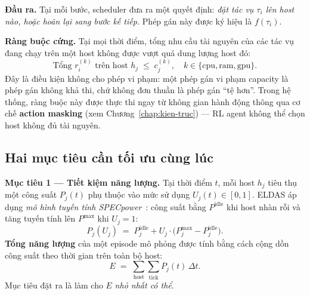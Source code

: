 \textbf{Đầu ra.} Tại mỗi bước, scheduler đưa ra một quyết định: \emph{đặt
tác vụ $\tau_i$ lên host nào, hoặc hoãn lại sang bước kế tiếp.} Phép gán
này được ký hiệu là $f(\tau_i)$.

\textbf{Ràng buộc cứng.} Tại mọi thời điểm, tổng nhu cầu tài nguyên của các
tác vụ đang chạy trên một host không được vượt quá dung lượng host đó:
\begin{equation}
  \text{Tổng } r^{(k)}_i \text{ trên host } h_j \;\le\; c^{(k)}_j,
  \quad k \in \{\mathrm{cpu},\mathrm{ram},\mathrm{gpu}\}.
  \label{eq:capacity}
\end{equation}
Đây là điều kiện không cho phép vi phạm: một phép gán vi phạm capacity là
phép gán không khả thi, chứ không đơn thuần là phép gán ``tệ hơn''. Trong
hệ thống, ràng buộc này được thực thi ngay từ không gian hành động thông
qua cơ chế \textbf{action masking} (xem Chương~\ref{chap:kien-truc}) ---
RL agent không thể chọn host không đủ tài nguyên.

\subsection{Hai mục tiêu cần tối ưu cùng lúc}
\textbf{Mục tiêu 1 --- Tiết kiệm năng lượng.} Tại thời điểm $t$, mỗi host
$h_j$ tiêu thụ một công suất $P_j(t)$ phụ thuộc vào mức sử dụng
$U_j(t) \in [0,1]$. ELDAS áp dụng \emph{mô hình tuyến tính
SPECpower}~\cite{beloglazov2012energy}: công suất bằng $P^{\mathrm{idle}}$
khi host nhàn rỗi và tăng tuyến tính lên $P^{\mathrm{max}}$ khi $U_j = 1$:
\begin{equation}
  P_j(U_j) \;=\; P^{\mathrm{idle}}_j
              + U_j \cdot \big(P^{\mathrm{max}}_j - P^{\mathrm{idle}}_j\big).
  \label{eq:power-model}
\end{equation}
\textbf{Tổng năng lượng} của một episode mô phỏng được tính bằng cách cộng
dồn công suất theo thời gian trên toàn bộ host:
\begin{equation}
  E \;=\; \sum_{\text{host}} \sum_{\text{tick}} P_j(t)\,\Delta t.
  \label{eq:total-energy}
\end{equation}
Mục tiêu đặt ra là làm cho $E$ \emph{nhỏ nhất có thể}.

